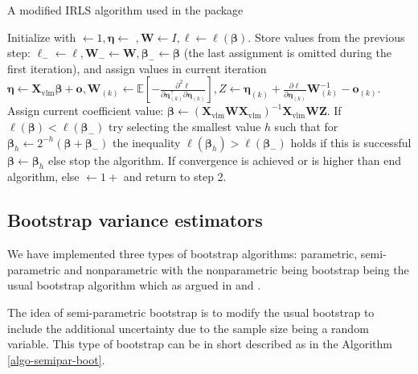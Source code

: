 \documentclass[
]{jss}
\newcommand{\1}{\mathcal{I}} \newcommand{\bZero}{\boldsymbol{0}}
\begin{document}
\begin{algorithm}[ht!]
\small
\caption{A modified IRLS algorithm used in the  package}
\label{algo-estimation}\DontPrintSemicolon
{} Initialize with $\leftarrow 1, \boldsymbol{\eta}\leftarrow$
    $, \boldsymbol{W}\leftarrow I, \ell\leftarrow\ell(\boldsymbol{\beta})$.\;
 Store values from the previous step: 
    $\ell_{-}\leftarrow\ell, \boldsymbol{W}_{-}\leftarrow\boldsymbol{W}, \boldsymbol{\beta}_{-}\leftarrow\boldsymbol{\beta}$ 
    (the last assignment is omitted during the first iteration), and assign values in current iteration 
    $\displaystyle\boldsymbol{\eta}\leftarrow\boldsymbol{X}_{\text{vlm}}\boldsymbol{\beta}+\boldsymbol{o}, \boldsymbol{W}_{(k)}\leftarrow\mathbb{E}\left[-\frac{\partial^{2}\ell}{\partial\boldsymbol{\eta}_{(k)}^\top\partial\boldsymbol{\eta}_{(k)}}\right], Z\leftarrow\boldsymbol{\eta}_{(k)}+\frac{\partial\ell}{\partial\boldsymbol{\eta}_{(k)}}\boldsymbol{W}_{(k)}^{-1}-\boldsymbol{o}_{(k)}$.\;
 Assign current coefficient value: 
    $\boldsymbol{\beta}\leftarrow\left(\boldsymbol{X}_{\text{vlm}}\boldsymbol{W}\boldsymbol{X}_{\text{vlm}}\right)^{-1}\boldsymbol{X}_{\text{vlm}}\boldsymbol{W}\boldsymbol{Z}$.\;
 If $\ell(\boldsymbol{\beta})<\ell(\boldsymbol{\beta}_{-})$ try selecting the smallest value $h$ such that for
    $\boldsymbol{\beta}_{h}\leftarrow2^{-h}\left(\boldsymbol{\beta}+\boldsymbol{\beta}_{-}\right)$ the inequality $\ell(\boldsymbol{\beta}_{h})>\ell(\boldsymbol{\beta}_{-})$ 
    holds if this is successful $\boldsymbol{\beta}\leftarrow\boldsymbol{\beta}_{h}$ else stop the algorithm.\;
 If convergence is achieved or  is higher than  end algorithm, 
    else $\leftarrow 1+$ and return to step 2.
\end{algorithm}

\subsection{Bootstrap variance estimators}\label{sec-boostrap}

We have implemented three types of bootstrap algorithms: parametric,
semi-parametric and nonparametric with the nonparametric being bootstrap
being the usual bootstrap algorithm which as argued in \cite{norrpoll}
and \cite{zwane}.

The idea of semi-parametric bootstrap is to modify the usual bootstrap
to include the additional uncertainty due to the sample size being a
random variable. This type of bootstrap can be in short described as in
the Algorithm \ref{algo-semipar-boot}.
\end{document}
